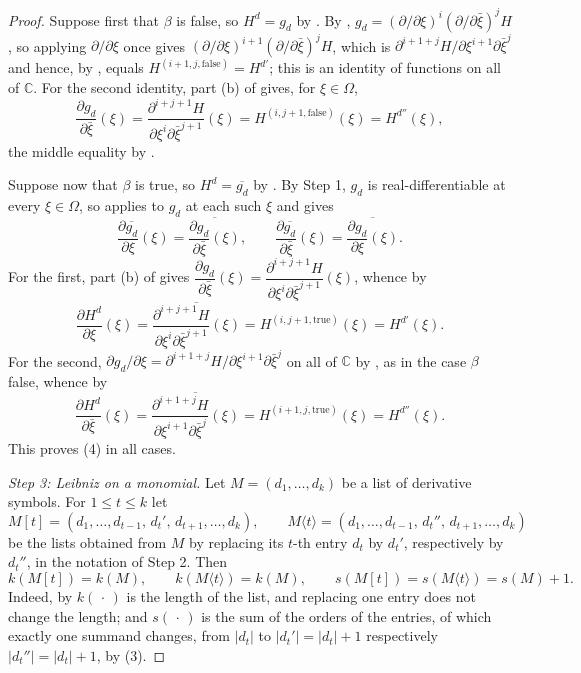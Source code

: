 \begin{proof}
Suppose first that $\beta$ is false, so $H^d=g_d$ by .
By , $g_d=(\partial/\partial\xi)^i(\partial/\partial\bar\xi)^jH$,
so applying $\partial/\partial\xi$ once gives
$(\partial/\partial\xi)^{i+1}(\partial/\partial\bar\xi)^jH$, which is
$\partial^{i+1+j}H/\partial\xi^{i+1}\partial\bar\xi^{j}$ and hence, by
, equals $H^{(i+1,j,\text{false})}=H^{d'}$; this is an
identity of functions on all of $\mathbb{C}$.  For the second identity, part
(b) of  gives, for $\xi\in\Omega$,
\[
  \frac{\partial g_d}{\partial\bar\xi}(\xi)
  =\frac{\partial^{i+j+1}H}{\partial\xi^{i}\partial\bar\xi^{j+1}}(\xi)
  =H^{(i,j+1,\text{false})}(\xi)=H^{d''}(\xi),
\]
the middle equality by .

Suppose now that $\beta$ is true, so $H^d=\overline{g_d}$ by
.  By Step 1, $g_d$ is real-differentiable at every
$\xi\in\Omega$, so  applies to $g_d$ at each such
$\xi$ and gives
\[
  \frac{\partial\overline{g_d}}{\partial\xi}(\xi)
  =\overline{\frac{\partial g_d}{\partial\bar\xi}(\xi)},
  \qquad
  \frac{\partial\overline{g_d}}{\partial\bar\xi}(\xi)
  =\overline{\frac{\partial g_d}{\partial\xi}(\xi)} .
\]
For the first, part (b) of  gives
$\dfrac{\partial g_d}{\partial\bar\xi}(\xi)
 =\dfrac{\partial^{i+j+1}H}{\partial\xi^{i}\partial\bar\xi^{j+1}}(\xi)$, whence
by 
\[
  \frac{\partial H^{d}}{\partial\xi}(\xi)
  =\overline{\frac{\partial^{i+j+1}H}{\partial\xi^{i}\partial\bar\xi^{j+1}}(\xi)}
  =H^{(i,j+1,\text{true})}(\xi)=H^{d'}(\xi).
\]
For the second, $\partial g_d/\partial\xi
=\partial^{i+1+j}H/\partial\xi^{i+1}\partial\bar\xi^{j}$ on all of $\mathbb{C}$
by , as in the case $\beta$ false, whence by
\[
  \frac{\partial H^{d}}{\partial\bar\xi}(\xi)
  =\overline{\frac{\partial^{i+1+j}H}{\partial\xi^{i+1}\partial\bar\xi^{j}}(\xi)}
  =H^{(i+1,j,\text{true})}(\xi)=H^{d''}(\xi).
\]
This proves (4) in all cases.

\emph{Step 3: Leibniz on a monomial.}  Let $M=(d_1,\dots,d_k)$ be a list of
derivative symbols.  For $1\le t\le k$ let
\[
  M[t]=(d_1,\dots,d_{t-1},\,d_t',\,d_{t+1},\dots,d_k),
  \qquad
  M\langle t\rangle=(d_1,\dots,d_{t-1},\,d_t'',\,d_{t+1},\dots,d_k)
\]
be the lists obtained from $M$ by replacing its $t$-th entry $d_t$ by $d_t'$,
respectively by $d_t''$, in the notation of Step 2.  Then
\begin{equation}\tag{5}
  k(M[t])=k(M),\qquad k(M\langle t\rangle)=k(M),
  \qquad
  s(M[t])=s(M\langle t\rangle)=s(M)+1 .
\end{equation}
Indeed, by  $k(\,\cdot\,)$ is the length of the list,
and replacing one entry does not change the length; and $s(\,\cdot\,)$ is the
sum of the orders of the entries, of which exactly one summand changes, from
$|d_t|$ to $|d_t'|=|d_t|+1$ respectively $|d_t''|=|d_t|+1$, by (3).


\end{proof}
